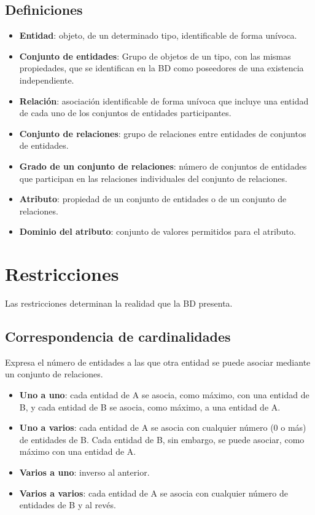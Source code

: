 \documentclass{article}
\begin{document}
\subsection{Definiciones}
\begin{itemize}
    \item \textbf{Entidad}: objeto, de un determinado tipo, identificable de forma unívoca.

    \item \textbf{Conjunto de entidades}: Grupo de objetos de un tipo, con las mismas propiedades, que se identifican en la BD como poseedores de una existencia independiente.

    \item \textbf{Relación}: asociación identificable de forma unívoca que incluye una entidad de cada uno de los conjuntos de entidades participantes. 

    \item \textbf{Conjunto de relaciones}: grupo de relaciones entre entidades de conjuntos de entidades.

    \item \textbf{Grado de un conjunto de relaciones}: número de conjuntos de entidades que participan en las relaciones individuales del conjunto de relaciones.

    \item \textbf{Atributo}: propiedad de un conjunto de entidades o de un conjunto de relaciones.

    \item \textbf{Dominio del atributo}: conjunto de valores permitidos para el atributo.
    
\end{itemize}

\newpage

\section{Restricciones}
Las restricciones determinan la realidad que la BD presenta.

\subsection{Correspondencia de cardinalidades}
Expresa el número de entidades a las que otra entidad se puede asociar mediante un conjunto de relaciones.
\begin{itemize}
    \item \textbf{Uno a uno}: cada entidad de A se asocia, como máximo, con una entidad de B, y cada entidad de B se asocia, como máximo, a una entidad de A.

    \item \textbf{Uno a varios}: cada entidad de A se asocia con cualquier número (0 o más) de entidades de B. Cada entidad de B, sin embargo, se puede asociar, como máximo con una entidad de A.

    \item \textbf{Varios a uno}: inverso al anterior.

    \item \textbf{Varios a varios}: cada entidad de A se asocia con cualquier número de entidades de B y al revés.
\end{itemize}
\end{document}
